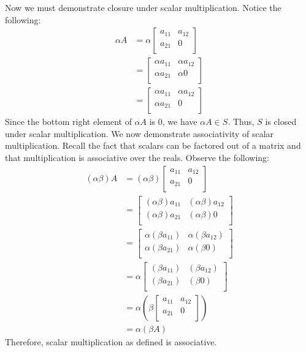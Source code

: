 \documentclass{article}
\begin{document}
Now we must demonstrate closure under scalar multiplication. Notice the following:
\begin{align*}
  \alpha A&=\alpha \begin{bmatrix}
    a_{11}  &a_{12}    \\
     a_{21} &0    \\
  \end{bmatrix}\\
  &=\begin{bmatrix}
    \alpha a_{11}  &\alpha a_{12}    \\
     \alpha a_{21} &\alpha 0    \\
  \end{bmatrix}\\
  &=\begin{bmatrix}
    \alpha a_{11}  &\alpha a_{12}    \\
     \alpha a_{21} & 0    \\
  \end{bmatrix}
\end{align*}
Since the bottom right element of \(\alpha A\) is \(0\), we have \(\alpha A\in S\). Thus, \(S\) is closed under scalar multiplication.
\newpage
We now demonstrate associativity of scalar multiplication. Recall the fact that scalars can be factored out of a matrix and that multiplication is associative over the reals. Observe the following:
\begin{align*}
  (\alpha \beta )A&=(\alpha \beta )\begin{bmatrix}
    a_{11}  &a_{12}    \\
     a_{21} &0    \\
  \end{bmatrix}\\
  &=\begin{bmatrix}
    (\alpha \beta )a_{11}  &(\alpha \beta )a_{12}    \\
    (\alpha \beta )a_{21} &(\alpha \beta )0    \\
  \end{bmatrix}\\
  &=\begin{bmatrix}
    \alpha (\beta a_{11})  &\alpha (\beta a_{12})    \\
    \alpha (\beta a_{21}) &\alpha (\beta 0)    \\
  \end{bmatrix}\\
  &=\alpha \begin{bmatrix}
     (\beta a_{11})  &(\beta a_{12})    \\
     (\beta a_{21}) & (\beta 0)    \\
  \end{bmatrix}\\
  &=\alpha \left(\beta \begin{bmatrix}
    a_{11}  &a_{12}    \\
     a_{21} &0    \\
  \end{bmatrix}\right)\\
  &=\alpha (\beta A)
\end{align*}
Therefore, scalar multiplication as defined is associative.
\end{document}
